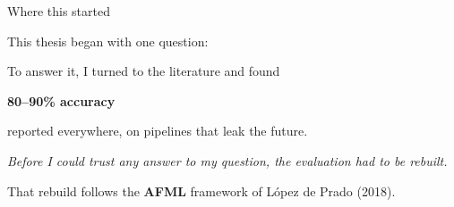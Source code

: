 \documentclass[aspectratio=169, t]{beamer}
\begin{document}
\begin{frame}[c]{Where this started}

\centering

{\large This thesis began with one question:}

\vspace{0.6em}


\vspace{1.0em}

{\large To answer it, I turned to the literature and found}

\vspace{0.4em}

{\fontsize{34}{40}\selectfont\bfseries\color{isegred} 80--90\% accuracy}

\vspace{0.4em}

{\large reported everywhere, on pipelines that leak the future.}

\vspace{0.8em}

{\footnotesize\itshape Before I could trust any answer to my question, the evaluation had to be rebuilt.}

\vspace{0.5em}

{\scriptsize That rebuild follows the \textbf{AFML} framework of López de Prado (2018).}

\end{frame}
\end{document}
